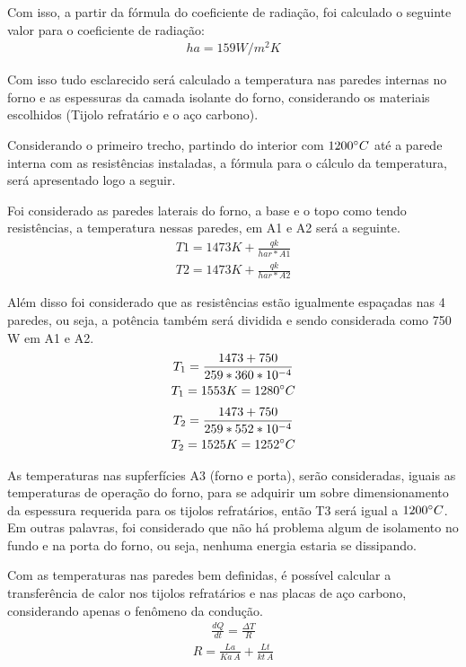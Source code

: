 Com isso, a partir da fórmula do coeficiente de radiação, foi calculado o seguinte valor para o coeficiente de radiação:
\begin{gather}
	ha = 159W/m^{2}K \nonumber
\end{gather}

Com isso tudo esclarecido será calculado a temperatura nas paredes internas no forno e as espessuras da camada isolante do forno, considerando os materiais escolhidos (Tijolo refratário e o aço carbono).

Considerando o primeiro trecho, partindo do interior com $1200 \degree C$ até a parede interna com as resistências instaladas, a fórmula para o cálculo da temperatura, será apresentado logo a seguir.

Foi considerado as paredes laterais do forno, a base e o topo como tendo resistências, a temperatura nessas paredes, em A1 e A2 será a seguinte.
\begin{gather}
	T1 = 1473K + \frac{qk}{har*A1} \nonumber \\
	T2 = 1473K + \frac{qk}{har*A2} \nonumber
\end{gather}

Além disso foi considerado que as resistências estão igualmente espaçadas nas 4 paredes, ou seja, a potência também será dividida e sendo considerada como 750 W em A1 e A2.
\begin{gather}
	T_1 = \frac{1473 + 750} {259*360*10^{-4}} \nonumber \\
	T_1 = 1553K = 1280 \degree C \nonumber
    \nonumber
\end{gather}
\begin{gather}
    T_2 = \frac{1473 + 750} {259   *552*10^{-4}} \nonumber \\
	T_2 = 1525K = 1252 \degree C \nonumber
\end{gather}

As temperaturas nas supferfícies A3 (forno e porta), serão consideradas, iguais as temperaturas de operação do forno, para se adquirir um sobre dimensionamento da espessura requerida para os tijolos refratários, então T3 será igual a $1200 \degree C$. Em outras palavras, foi considerado que não há problema algum de isolamento no fundo e na porta do forno, ou seja, nenhuma energia estaria se dissipando.

Com as temperaturas nas paredes bem definidas, é possível calcular a transferência de calor nos tijolos refratários e nas placas de aço carbono, considerando apenas o fenômeno da condução.
\begin{gather}
	\frac{dQ}{dt} = \frac{\Delta T}{R}
\end{gather}
\begin{gather}
	R = \frac{La}{Ka\, A} + \frac{Lt}{kt\, A}
\end{gather}


